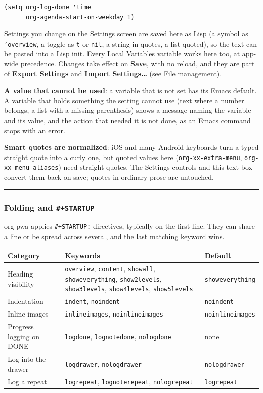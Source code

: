 \documentclass[11pt]{article}
\begin{document}
\begin{verbatim}
(setq org-log-done 'time
      org-agenda-start-on-weekday 1)
\end{verbatim}

Settings you change on the Settings screen are saved here as Lisp (a symbol as \texttt{'overview}, a toggle as \texttt{t} or \texttt{nil}, a string in quotes, a list quoted), so the text can be pasted into a Lisp init. Every Local Variables variable works here too, at app-wide precedence. Changes take effect on \textbf{Save}, with no reload, and they are part of \textbf{Export Settings} and \textbf{Import Settings…} (see \hyperref[sec:orgc48c2f3]{File management}).

\textbf{A value that cannot be used}: a variable that is not set has its Emacs default. A variable that holds something the setting cannot use (text where a number belongs, a list with a missing parenthesis) shows a message naming the variable and its value, and the action that needed it is not done, as an Emacs command stops with an error.

\textbf{Smart quotes are normalized}: iOS and many Android keyboards turn a typed straight quote into a curly one, but quoted values here (\texttt{org-xx-extra-menu}, \texttt{org-xx-menu-aliases}) need straight quotes. The Settings controls and this text box convert them back on save; quotes in ordinary prose are untouched.

\noindent\rule{\textwidth}{0.5pt}

\subsubsection{Folding and \texttt{\#+STARTUP}}
\label{sec:org4faaf88}
org-pwa applies \texttt{\#+STARTUP:} directives, typically on the first line. They can share a line or be spread across several, and the last matching keyword wins.

\begin{center}
\begin{tabular}{lll}
Category & Keywords & Default\\[0pt]
\hline
Heading visibility & \texttt{overview}, \texttt{content}, \texttt{showall}, \texttt{showeverything}, \texttt{show2levels}, \texttt{show3levels}, \texttt{show4levels}, \texttt{show5levels} & \texttt{showeverything}\\[0pt]
Indentation & \texttt{indent}, \texttt{noindent} & \texttt{noindent}\\[0pt]
Inline images & \texttt{inlineimages}, \texttt{noinlineimages} & \texttt{noinlineimages}\\[0pt]
Progress logging on DONE & \texttt{logdone}, \texttt{lognotedone}, \texttt{nologdone} & none\\[0pt]
Log into the drawer & \texttt{logdrawer}, \texttt{nologdrawer} & \texttt{nologdrawer}\\[0pt]
Log a repeat & \texttt{logrepeat}, \texttt{lognoterepeat}, \texttt{nologrepeat} & \texttt{logrepeat}\\[0pt]
\end{tabular}
\end{center}
\end{document}
